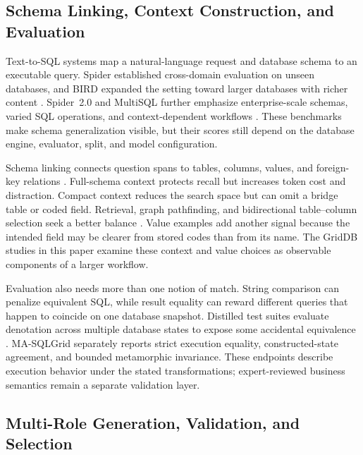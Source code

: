 \documentclass[information,article,submit,moreauthors]{Definitions/mdpi}
\newcommand{\masql}{MA-SQLGrid}
\begin{document}
\subsection{Schema Linking, Context Construction, and Evaluation}

Text-to-SQL systems map a natural-language request and database schema to an executable query. Spider established cross-domain evaluation on unseen databases, and BIRD expanded the setting toward larger databases with richer content \cite{yu2018spider,li2023bird}. Spider~2.0 and MultiSQL further emphasize enterprise-scale schemas, varied SQL operations, and context-dependent workflows \cite{lei2025spider2,li2024multisql}. These benchmarks make schema generalization visible, but their scores still depend on the database engine, evaluator, split, and model configuration.

Schema linking connects question spans to tables, columns, values, and foreign-key relations \cite{wang2020ratsql,lei2020reexamining,liu2022semantic}. Full-schema context protects recall but increases token cost and distraction. Compact context reduces the search space but can omit a bridge table or coded field. Retrieval, graph pathfinding, and bidirectional table--column selection seek a better balance \cite{bozdemir2026schema,liu2025solidsql,hao2025genlink,wang2025linkalign,safdarian2026schemagraphsql,nahid2026bidirectional}. Value examples add another signal because the intended field may be clearer from stored codes than from its name. The GridDB studies in this paper examine these context and value choices as observable components of a larger workflow.

Evaluation also needs more than one notion of match. String comparison can penalize equivalent SQL, while result equality can reward different queries that happen to coincide on one database snapshot. Distilled test suites evaluate denotation across multiple database states to expose some accidental equivalence \cite{zhong2020semantic}. \masql{} separately reports strict execution equality, constructed-state agreement, and bounded metamorphic invariance. These endpoints describe execution behavior under the stated transformations; expert-reviewed business semantics remain a separate validation layer.

\subsection{Multi-Role Generation, Validation, and Selection}
\end{document}
